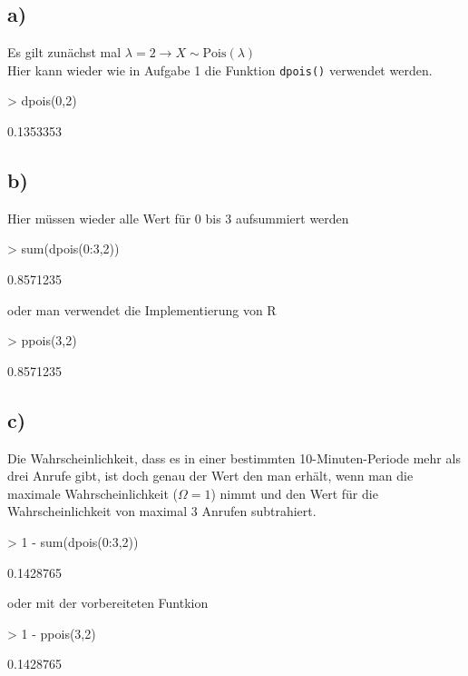 \subsection{a)}
Es gilt zunächst mal $\lambda = 2 \rightarrow X \sim \text{Pois}(\lambda)$\\

\noindent
Hier kann wieder wie in Aufgabe 1 die Funktion \verb!dpois()! verwendet 
werden.
\begin{Schunk}
\begin{Sinput}
> dpois(0,2)
\end{Sinput}
\begin{Soutput}
[1] 0.1353353
\end{Soutput}
\end{Schunk}

\subsection*{b)}
Hier müssen wieder alle Wert für $0$ bis $3$ aufsummiert werden
\begin{Schunk}
\begin{Sinput}
> sum(dpois(0:3,2))
\end{Sinput}
\begin{Soutput}
[1] 0.8571235
\end{Soutput}
\end{Schunk}
oder man verwendet die Implementierung von R 
\begin{Schunk}
\begin{Sinput}
> ppois(3,2)
\end{Sinput}
\begin{Soutput}
[1] 0.8571235
\end{Soutput}
\end{Schunk}

\subsection*{c)}
Die Wahrscheinlichkeit, dass es in einer bestimmten 10-Minuten-Periode
mehr als drei Anrufe gibt, ist doch genau der Wert den man erhält, wenn
man die maximale Wahrscheinlichkeit ($\Omega = 1$) nimmt und den Wert für 
die Wahrscheinlichkeit von maximal $3$ Anrufen subtrahiert.
\begin{Schunk}
\begin{Sinput}
> 1 - sum(dpois(0:3,2))
\end{Sinput}
\begin{Soutput}
[1] 0.1428765
\end{Soutput}
\end{Schunk}
oder mit der vorbereiteten Funtkion
\begin{Schunk}
\begin{Sinput}
> 1 - ppois(3,2)
\end{Sinput}
\begin{Soutput}
[1] 0.1428765
\end{Soutput}
\end{Schunk}

